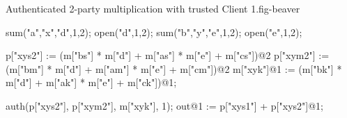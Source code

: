 \begin{fpfig}[t]{Authenticated 2-party multiplication with trusted Client 1.}{fig-beaver}
{\footnotesize
  \begin{verbatimtab}
sum("a","x","d",1,2);
open("d",1,2);
sum("b","y","e",1,2);
open("e",1,2);

p["xys2"] := (m["bs"] * m["d"] + m["as"] * m["e"] + m["cs"])@2
p["xym2"] := (m["bm"] * m["d"] + m["am"] * m["e"] + m["cm"])@2
m["xyk"]@1 := (m["bk"] * m["d"] + m["ak"] * m["e"] + m["ck"])@1;

auth(p["xys2"], p["xym2"], m["xyk"], 1);
out@1 := p["xys1"] + p["xys2"]@1;
\end{verbatimtab}
}
\end{fpfig}

\begin{comment}

\begin{fpfig}[t]{Authenticated 2-Party Multiplication.}{fig-beaver}
{\footnotesize
  \begin{verbatimtab}
    secopen("a","x","d",1,2);
    secopen("a","x","d",2,1);
    secopen("b","y","e",1,2);
    secopen("b","y","e",2,1);
    let xys =
      macsum(macctimes(macshare("b"), m["d"]),
             macsum(macctimes(macshare("a"), m["e"]),
                    macshare("c")))
    in
    let xyk = mack("b") * m["d"] + mack("a") * m["d"] + mack("c")               
    in
    secreveal(xys,xyk,"1",1,2);
    secreveal(maccsum(xys,m["d"] * m["e"]),
              xyk - m["d"] * m["e"],
              "2",2,1);
    out@1 := (p[1] + p[2])@1;
    out@2 := (p[1] + p[2])@2;
  \end{verbatimtab}
}
\end{fpfig}

\end{comment}
